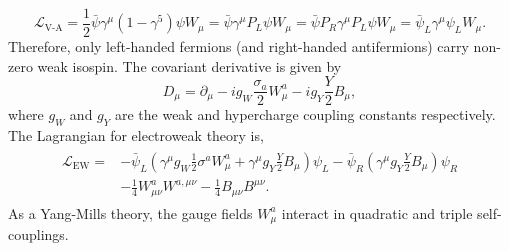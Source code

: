 \begin{equation}
    \label{eq:v-a_coupling}
    \mathcal{L}_\text{V-A}
    = \frac{1}{2} \bar \psi \gamma^\mu (1 - \gamma^5) \psi W_\mu
    = \bar \psi \gamma^\mu P_L \psi W_\mu
    = \bar \psi P_R \gamma^\mu P_L \psi W_\mu
    = \bar \psi_L \gamma^\mu \psi_L W_\mu.
\end{equation}
Therefore, only left-handed fermions (and right-handed antifermions) carry non-zero weak isospin.
The covariant derivative is given by
\begin{equation}
    \label{eq:ew_covariant_derivative}
    D_\mu = \partial_\mu - i g_W \frac{\sigma_a}{2} W_\mu^a - i g_Y \frac{Y}{2} B_\mu,
\end{equation}
where $g_W$ and $g_Y$ are the weak and hypercharge coupling constants respectively.
The Lagrangian for electroweak theory is,
\begin{align}
    \begin{split}
        \label{eq:ew_lagrangian}
        \mathcal{L}_\text{EW} = & - \bar{\psi}_L \left( \gamma^\mu g_W \frac{1}{2} \sigma^a W^a_\mu + \gamma^\mu g_Y \frac{Y}{2} B_\mu \right) \psi_L - \bar{\psi}_R \left( \gamma^\mu g_Y \frac{Y}{2} B_\mu \right) \psi_R \\
                                & - \frac{1}{4} W_{\mu\nu}^a W^{a,\mu\nu} - \frac{1}{4} B_{\mu\nu} B^{\mu\nu}.
    \end{split}
\end{align}
As a Yang-Mills theory, the gauge fields $W_\mu^a$ interact in quadratic and triple self-couplings.

